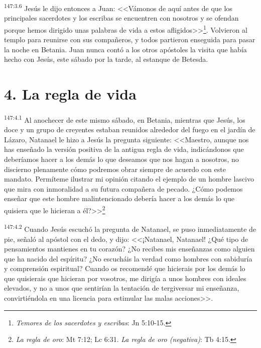 \par 
\textsuperscript{147:3.6} Jesús le dijo entonces a Juan: <<Vámonos de aquí antes de que los principales sacerdotes y los escribas se encuentren con nosotros y se ofendan porque hemos dirigido unas palabras de vida a estos afligidos>>\footnote{\textit{Temores de los sacerdotes y escribas}: Jn 5:10-15.}. Volvieron al templo para reunirse con sus compañeros, y todos partieron enseguida para pasar la noche en Betania. Juan nunca contó a los otros apóstoles la visita que había hecho con Jesús, este sábado por la tarde, al estanque de Betesda.

\section*{4. La regla de vida}
\par 
\textsuperscript{147:4.1} Al anochecer de este mismo sábado, en Betania, mientras que Jesús, los doce y un grupo de creyentes estaban reunidos alrededor del fuego en el jardín de Lázaro, Natanael le hizo a Jesús la pregunta siguiente: <<Maestro, aunque nos has enseñado la versión positiva de la antigua regla de vida, indicándonos que deberíamos hacer a los demás lo que deseamos que nos hagan a nosotros, no discierno plenamente cómo podremos obrar siempre de acuerdo con este mandato. Permíteme ilustrar mi opinión citando el ejemplo de un hombre lascivo que mira con inmoralidad a su futura compañera de pecado. ¿Cómo podemos enseñar que este hombre malintencionado debería hacer a los demás lo que quisiera que le hicieran a él?>>\footnote{\textit{La regla de oro}: Mt 7:12; Lc 6:31. \textit{La regla de oro (negativa)}: Tb 4:15.}

\par 
\textsuperscript{147:4.2} Cuando Jesús escuchó la pregunta de Natanael, se puso inmediatamente de pie, señaló al apóstol con el dedo, y dijo: <<¡Natanael, Natanael! ¿Qué tipo de pensamientos mantienes en tu corazón? ¿No recibes mis enseñanzas como alguien que ha nacido del espíritu? ¿No escucháis la verdad como hombres con sabiduría y comprensión espiritual? Cuando os recomendé que hicierais por los demás lo que quisierais que hicieran por vosotros, me dirigía a unos hombres con ideales elevados, y no a unos que sentirían la tentación de tergiversar mi enseñanza, convirtiéndola en una licencia para estimular las malas acciones>>.

